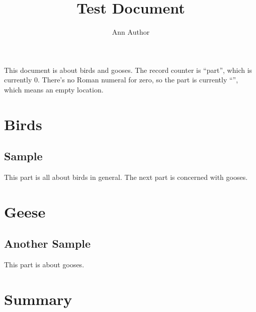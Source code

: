 \documentclass{report}
\title{Test Document}
\author{Ann Author}
\begin{document}
\maketitle

This document is about \glspl{bird} and \glspl{goose}.
The record counter is ``part'', which is currently 0.
There's no Roman numeral for zero, so the part is currently
``\thepart'', which means an empty location.

\part{Birds}
\chapter{Sample}

This part is all about \glspl{bird} in general. The next part is
concerned with \glspl{goose}.

\part{Geese}
\chapter{Another Sample}

This part is about \glspl{goose}.

\part{Summary}
\printunsrtglossary
\end{document}
